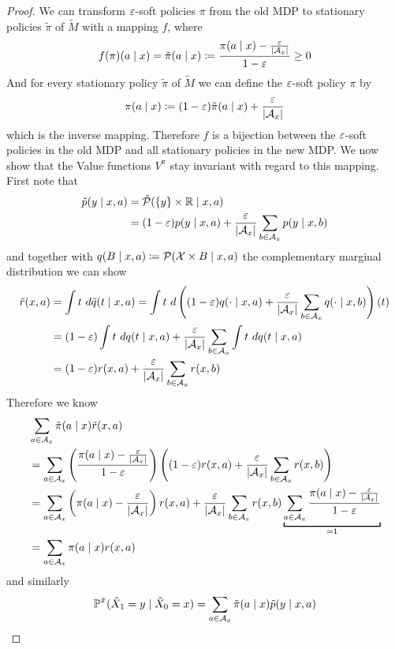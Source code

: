 \begin{proof}
	We can transform \(\varepsilon\)-soft policies \(\pi\) from the old MDP to stationary policies \(\tilde{\pi}\) of \(\tilde{M}\) with a mapping \(f\), where
	\[
		f(\pi)(a\mid x)=\tilde{\pi}(a\mid x)\coloneqq \frac{\pi(a\mid x)-\frac{\varepsilon}{|\mathcal{A}_x|}}{1-\varepsilon}\ge 0
	\]
	And for every stationary policy \(\tilde{\pi}\) of \(\tilde{M}\) we can define the \(\varepsilon\)-soft policy \(\pi\) by
	\[
		\pi(a\mid x)\coloneqq (1-\varepsilon)\tilde{\pi}(a\mid x) + \frac{\varepsilon}{|\mathcal{A}_x|}
	\]
	which is the inverse mapping. Therefore \(f\) is a bijection between the \(\varepsilon\)-soft policies in the old MDP and all stationary policies in the new MDP. We now show that the Value functions \(V^\pi\) stay invariant with regard to this mapping. 
	First note that
	\begin{align*}
		\tilde{p}(y\mid x,a)
		&=\tilde{\mathcal{P}}(\{y\}\times \mathbb{R}\mid x,a)\\
		&=(1-\varepsilon)p(y\mid x,a)+\frac{\varepsilon}{|\mathcal{A}_x|}\sum_{b\in\mathcal{A}_x}p(y\mid x,b)
	\end{align*}
	and together with \(q(B\mid x,a)\coloneqq \mathcal{P}(\mathcal{X}\times B \mid x,a)\) the complementary marginal distribution we can show
	\begin{align*}
		\tilde{r}(x,a)&=\int t\ d\tilde{q}(t \mid x,a)=\int t\ 
		d\left((1-\vep)q(\cdot\mid x,a) + \frac{\vep}{|\cA_x|}\sum_{b\in\cA_x}q(\cdot\mid x,b)\right)(t) \\
		&=(1-\vep)\int t\ dq(t\mid x,a) 
		+ \frac{\vep}{|\cA_x|}\sum_{b\in\cA_x} \int t\ dq(t\mid x,a)\\
		&=(1-\vep)r(x,a) + \frac{\vep}{|\cA_x|}\sum_{b\in\cA_x}r(x,b)
	\end{align*}
	Therefore we know
	\begin{align*}
		&\sum_{a\in\cA_x}\tilde{\pi}(a\mid x)\tilde{r}(x,a)\\
		&=\sum_{a\in\cA_x} \left(\frac{\pi(a\mid x)-\frac{\vep}{|\cA_x|}}{1-\vep} \right)
		\left((1-\vep)r(x,a) + \frac{\vep}{|\cA_x|}\sum_{b\in\cA_x}r(x,b)\right)\\
		&=\sum_{a\in\cA_x}\left(\pi(a\mid x)-\frac{\vep}{|\cA_x|}\right)r(x,a) 
		+ \frac{\vep}{|\cA_x|}\sum_{b\in\cA_x}r(x,b) 
		\underbracket[1pt]{\sum_{a\in\cA_x}\frac{\pi(a\mid x)-\frac{\vep}{|\cA_x|}}{1-\vep}}_{
			=1
		}\\
		&=\sum_{a\in\cA_x}\pi(a\mid x)r(x,a)
	\end{align*}
	and similarly
	\begin{align*}
		&\Pr^{\tilde{\pi}}(\tilde{X}_1=y\mid \tilde{X}_0=x) 
		=\sum_{a\in\cA_x}\tilde{\pi}(a\mid x)\tilde{p}(y\mid x,a)\\

\end{align*}
\end{proof}
